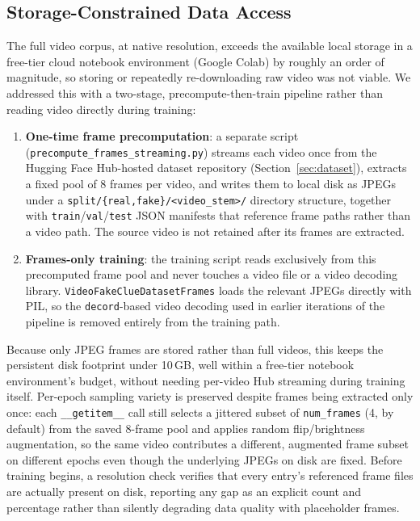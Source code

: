 \documentclass[acmsmall,review=false]{acmart}
\begin{document}
\subsection{Storage-Constrained Data Access}

The full video corpus, at native resolution, exceeds the available local
storage in a free-tier cloud notebook environment (Google Colab) by roughly an
order of magnitude, so storing or repeatedly re-downloading raw video was not
viable. We addressed this with a two-stage, precompute-then-train pipeline
rather than reading video directly during training:

\begin{enumerate}[nosep]
    \item \textbf{One-time frame precomputation}: a separate script
    (\texttt{precompute\_frames\_streaming.py}) streams each video once from
    the Hugging Face Hub-hosted dataset repository (Section~\ref{sec:dataset}),
    extracts a fixed pool of 8 frames per video, and writes them to local disk
    as JPEGs under a \texttt{split/\{real,fake\}/<video\_stem>/} directory
    structure, together with \texttt{train}/\texttt{val}/\texttt{test} JSON
    manifests that reference frame paths rather than a video path. The source
    video is not retained after its frames are extracted.
    \item \textbf{Frames-only training}: the training script reads exclusively
    from this precomputed frame pool and never touches a video file or a video
    decoding library. \texttt{VideoFakeClueDatasetFrames} loads the relevant
    JPEGs directly with PIL, so the \texttt{decord}-based video decoding used
    in earlier iterations of the pipeline is removed entirely from the
    training path.
\end{enumerate}

Because only JPEG frames are stored rather than full videos, this keeps the
persistent disk footprint under 10\,GB, well within a free-tier notebook
environment's budget, without needing per-video Hub streaming during training
itself. Per-epoch sampling variety is preserved despite frames being extracted
only once: each \texttt{\_\_getitem\_\_} call still selects a jittered subset
of \texttt{num\_frames} (4, by default) from the saved 8-frame pool and applies
random flip/brightness augmentation, so the same video contributes a
different, augmented frame subset on different epochs even though the
underlying JPEGs on disk are fixed. Before training begins, a resolution check
verifies that every entry's referenced frame files are actually present on
disk, reporting any gap as an explicit count and percentage rather than
silently degrading data quality with placeholder frames.
\end{document}
